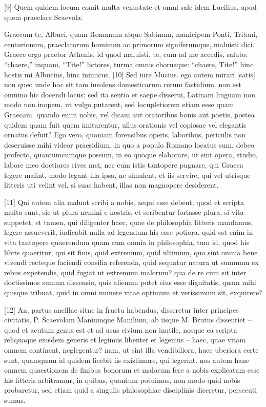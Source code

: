 \documentclass{article}
\begin{document}
[9] Quem quidem locum comit multa venustate et omni sale idem Lucilius, apud quem praeclare Scaevola:

Graecum te, Albuci, quam Romanum atque Sabinum,
municipem Ponti, Tritani, centurionum,
praeclarorum hominum ac primorum signiferumque,
maluisti dici. Graece ergo praetor Athenis,
id quod maluisti, te, cum ad me accedis, saluto:
``chaere,'' inquam, ``Tite!'' lictores, turma omnis chorusque:
``chaere, Tite!'' hinc hostis mi Albucius, hinc inimicus.
[10] Sed iure Mucius. ego autem mirari [satis] non queo unde hoc sit tam insolens domesticarum rerum fastidium. non est omnino hic docendi locus; sed ita sentio et saepe disserui, Latinam linguam non modo non inopem, ut vulgo putarent, sed locupletiorem etiam esse quam Graecam. quando enim nobis, vel dicam aut oratoribus bonis aut poetis, postea quidem quam fuit quem imitarentur, ullus orationis vel copiosae vel elegantis ornatus defuit? Ego vero, quoniam forensibus operis, laboribus, periculis non deseruisse mihi videor praesidium, in quo a populo Romano locatus sum, debeo profecto, quantumcumque possum, in eo quoque elaborare, ut sint opera, studio, labore meo doctiores cives mei, nec cum istis tantopere pugnare, qui Graeca legere malint, modo legant illa ipsa, ne simulent, et iis servire, qui vel utrisque litteris uti velint vel, si suas habent, illas non magnopere desiderent.

[11] Qui autem alia malunt scribi a nobis, aequi esse debent, quod et scripta multa sunt, sic ut plura nemini e nostris, et scribentur fortasse plura, si vita suppetet; et tamen, qui diligenter haec, quae de philosophia litteris mandamus, legere assueverit, iudicabit nulla ad legendum his esse potiora. quid est enim in vita tantopere quaerendum quam cum omnia in philosophia, tum id, quod his libris quaeritur, qui sit finis, quid extremum, quid ultimum, quo sint omnia bene vivendi recteque faciendi consilia referenda, quid sequatur natura ut summum ex rebus expetendis, quid fugiat ut extremum malorum? qua de re cum sit inter doctissimos summa dissensio, quis alienum putet eius esse dignitatis, quam mihi quisque tribuat, quid in omni munere vitae optimum et verissimum sit, exquirere?

[12] An, partus ancillae sitne in fructu habendus, disseretur inter principes civitatis, P. Scaevolam Maniumque Manilium, ab iisque M. Brutus dissentiet -- quod et acutum genus est et ad usus civium non inutile, nosque ea scripta reliquaque eiusdem generis et legimus libenter et legemus -- haec, quae vitam omnem continent, neglegentur? nam, ut sint illa vendibiliora, haec uberiora certe sunt. quamquam id quidem licebit iis existimare, qui legerint. nos autem hanc omnem quaestionem de finibus bonorum et malorum fere a nobis explicatam esse his litteris arbitramur, in quibus, quantum potuimus, non modo quid nobis probaretur, sed etiam quid a singulis philosophiae disciplinis diceretur, persecuti sumus.
\end{document}
